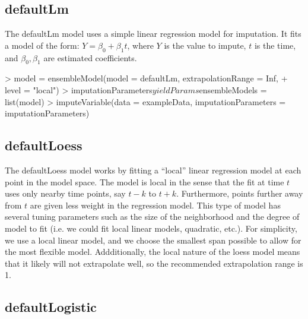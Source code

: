 \documentclass[nojss]{jss}
\begin{document}
\subsection{defaultLm}

The defaultLm model uses a simple linear regression model for imputation.  It
fits a model of the form: $Y = \beta_0 + \beta_1 t$, where $Y$ is the value to
impute, $t$ is the time, and $\beta_0, \beta_1$ are estimated coefficients.

\begin{Schunk}
\begin{Sinput}
> model = ensembleModel(model = defaultLm, extrapolationRange = Inf,
+                       level = "local")
> imputationParameters$yieldParams$ensembleModels = list(model)
> imputeVariable(data = exampleData, imputationParameters = imputationParameters)
\end{Sinput}
\end{Schunk}

\subsection{defaultLoess}

The defaultLoess model works by fitting a ``local'' linear regression model at
each point in the model space.  The model is local in the sense that the fit at
time $t$ uses only nearby time points, say $t-k$ to $t+k$.  Furthermore, points
further away from $t$ are given less weight in the regression model.  This type
of model has several tuning parameters such as the size of the neighborhood and
the degree of model to fit (i.e. we could fit local linear models, quadratic,
etc.).  For simplicity, we use a local linear model, and we choose the smallest
span possible to allow for the most flexible model.  Addditionally, the local
nature of the loess model means that it likely will not extrapolate well, so
the recommended extrapolation range is 1.

\begin{Schunk}
\end{Schunk}

\subsection{defaultLogistic}
\end{document}
